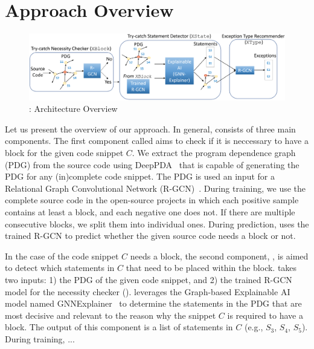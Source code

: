 \section{Approach Overview}
\label{sec:overview}


\begin{figure}[t]
\begin{center}
\includegraphics[width=5.4in]{overview.png}
\vspace{-10pt}
\caption{{\tool}: Architecture Overview}
\label{overview}
\end{center}
\end{figure}

Let us present the overview of our approach. In general, {\tool}
consists of three main components. The first component called
{\xblock} aims to check if it is neccessary to have a 
block for the given code snippet $C$. We extract the program dependence
graph (PDG) from the source code using DeepPDA~\cite{icse23} that is
capable of generating the PDG for any (in)complete code
snippet. The PDG is used an input for a Relational Graph Convolutional
Network (R-GCN)~\cite{yi}. During training, we use the complete source
code in the open-source projects in which each positive sample
contains at least a  block, and each negative one does
not. If there are multiple consecutive blocks, we split them into
individual ones. During prediction, {\xblock} uses the trained R-GCN
to predict whether the given source code needs a 
block or not.

In the case of the code snippet $C$ needs a  block,
the second component, {\xstate}, is aimed to detect which statements
in $C$ that need to be placed within the  block.
{\xstate} takes two inputs: 1) the PDG of the given code snippet, and
2) the trained R-GCN model for the  necessity checker
({\xblock}). {\xstate} leverages the Graph-based Explainable AI model
named GNNExplainer~\cite{tien} to determine the statements in the PDG
that are most decisive and relevant to the reason why the snippet $C$
is required to have a  block. The output of this
component is a list of statements in $C$ (e.g., $S_3$, $S_4$, $S_5$).
During training, ...
